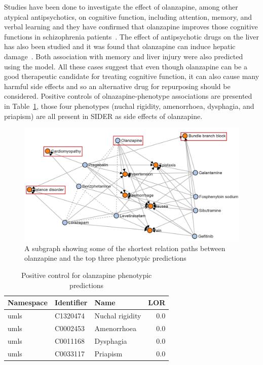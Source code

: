Studies have been done to investigate the effect of olanzapine, among other atypical antipsychotics, on cognitive function, including attention, memory, and verbal learning and they have confirmed that olanzapine improves those cognitive functions in schizophrenia patients~\cite{mcgurk_cognitive_2004, smith_effects_2001, cuesta_effects_2001, purdon_neuropsychological_2000, bilder_neurocognitive_2002}.
The effect of antipsychotic drugs on the liver has also been studied and it was found that olanzapine can induce hepatic damage~\cite{lv_antipsychotic_2018}.
Both association with memory and liver injury were also predicted using the model. 
All these cases suggest that even though olanzapine can be a good therapeutic candidate for treating cognitive function, it can also cause many harmful side effects and so an alternative drug for repurposing should be considered.
Positive controls of olnazapine-phenotype associations are presented in Table~\ref{tab:ps_olanzapine}, those four phenotypes (nuchal rigidity, amenorrhoea, dysphagia, and priapism) are all present in \ac{SIDER} as side effects of olanzapine.

\begin{figure}[!ht]
    \centering
    \includegraphics[scale=0.6]
    {figures/olanzapine_phenotypes.jpg}
    \caption[Olanzapine's path subgraph for all phenotypes]{\label{fig:olanzapine_phenotypes} A subgraph showing some of the shortest relation paths between olanzapine and the top three phenotypic predictions}
\end{figure}

\begin{table}[!ht]
    \centering
    \begin{tabular}{|l|l|l|r|}
        \hline
        \textbf{Namespace} & \textbf{Identifier} & \textbf{Name} & \textbf{LOR} \\
        \hline
        umls & C1320474 & Nuchal rigidity & 0.0 \\
        \hline
        umls & C0002453 & Amenorrhoea & 0.0  \\
        \hline
        umls & C0011168 & Dysphagia & 0.0  \\
        \hline
        umls & C0033117 & Priapism & 0.0 \\
        \hline
    \end{tabular}
    \captionsetup{justification=centering}
    \caption{Positive control for olanzapine phenotypic predictions}
    \label{tab:ps_olanzapine}
\end{table}


